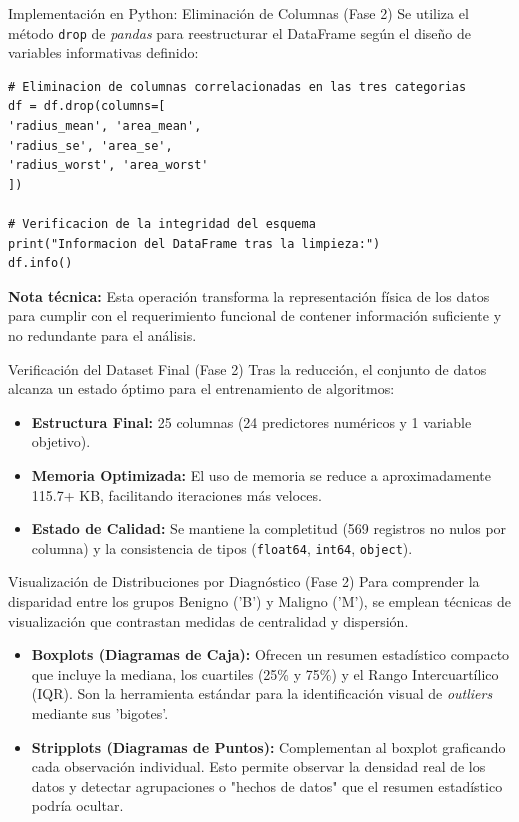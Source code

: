 \documentclass{beamer}
\begin{document}
	\begin{frame}[fragile]{Implementación en Python: Eliminación de Columnas (Fase 2)}
		Se utiliza el método \texttt{drop} de \textit{pandas} para reestructurar el DataFrame según el diseño de variables informativas definido:
		
		\begin{lstlisting}[style=colab]
# Eliminacion de columnas correlacionadas en las tres categorias
df = df.drop(columns=[
'radius_mean', 'area_mean', 
'radius_se', 'area_se', 
'radius_worst', 'area_worst'
])

# Verificacion de la integridad del esquema
print("Informacion del DataFrame tras la limpieza:")
df.info()
		\end{lstlisting}
		
		\textbf{Nota técnica:} Esta operación transforma la representación física de los datos para cumplir con el requerimiento funcional de contener información suficiente y no redundante para el análisis.
	\end{frame}
	
	\begin{frame}{Verificación del Dataset Final (Fase 2)}
		Tras la reducción, el conjunto de datos alcanza un estado óptimo para el entrenamiento de algoritmos:
		
		\begin{itemize}
			\item<2-> \textbf{Estructura Final:} 25 columnas (24 predictores numéricos y 1 variable objetivo).
			\item<3-> \textbf{Memoria Optimizada:} El uso de memoria se reduce a aproximadamente 115.7+ KB, facilitando iteraciones más veloces.
			\item<4-> \textbf{Estado de Calidad:} Se mantiene la completitud (569 registros no nulos por columna) y la consistencia de tipos (\texttt{float64}, \texttt{int64}, \texttt{object}).
		\end{itemize}
	\end{frame}
	
	\begin{frame}{Visualización de Distribuciones por Diagnóstico (Fase 2)}
		Para comprender la disparidad entre los grupos Benigno ('B') y Maligno ('M'), se emplean técnicas de visualización que contrastan medidas de centralidad y dispersión.
		
		\begin{itemize}
			\item<2-> \textbf{Boxplots (Diagramas de Caja):} Ofrecen un resumen estadístico compacto que incluye la mediana, los cuartiles (25\% y 75\%) y el Rango Intercuartílico (IQR). Son la herramienta estándar para la identificación visual de \textit{outliers} mediante sus 'bigotes'.
			\item<3-> \textbf{Stripplots (Diagramas de Puntos):} Complementan al boxplot graficando cada observación individual. Esto permite observar la densidad real de los datos y detectar agrupaciones o "hechos de datos" que el resumen estadístico podría ocultar.
		\end{itemize}
	\end{frame}
	
\end{document}
